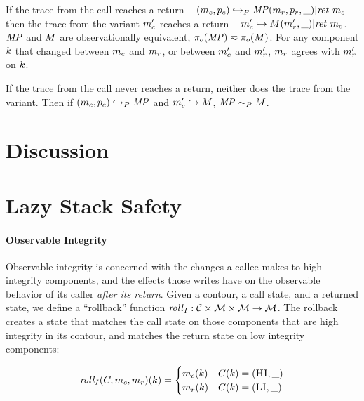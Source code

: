 \documentclass[acmsmall,review,anonymous]{acmart}\settopmatter{printfolios=true,printccs=false,printacmref=false}
\begin{document}
If the trace from the call reaches a return -- \((m_c,p_c)
\hookrightarrow_P \mathit{MP} (m_r,p_r,\_) | \mathit{ret}\ m_c\) --
then the trace from the variant \(m_c'\) reaches a return --
\(m_c' \hookrightarrow M (m_r',\_) | \mathit{ret}\ m_c\).
\(\mathit{MP}\) and \(M\) are observationally equivalent, \(\pi_o(\mathit{MP}) \eqsim
\pi_o(M)\). For any component \(k\) that changed between
\(m_c\) and \(m_r\), or between \(m_c'\) and \(m_r'\),
\(m_r\) agrees with \(m_r'\) on \(k\).

If the trace from the call never reaches a return, neither does the
trace from the variant. Then if \((m_c,p_c) \hookrightarrow_P
\mathit{MP}\) and \(m_c' \hookrightarrow M\), \(\mathit{MP} \sim_P M\).


\section{Discussion}


\section{Lazy Stack Safety}

    \paragraph{Observable Integrity}

      Observable integrity is concerned with the changes a callee makes to high integrity components,
      and the effects those writes have on the observable behavior of its caller
      {\it after its return}. Given a contour, a call state, and a returned state, we define
      a ``rollback'' function \(\mathit{roll}_I : {\mathcal C} \times {\mathcal M} \times {\mathcal M}
      \rightarrow {\mathcal M}\). The rollback creates a state that matches the call
      state on those components that are high integrity in its contour, and matches the return state
      on low integrity components:

      \[\mathit{roll}_I(C,m_c,m_r)(k) =
      \begin{cases}
        m_c(k) & C(k) = (\textsc{HI},\_) \\
        m_r(k) & C(k) = (\textsc{LI},\_) \\
      \end{cases}\]
\end{document}

